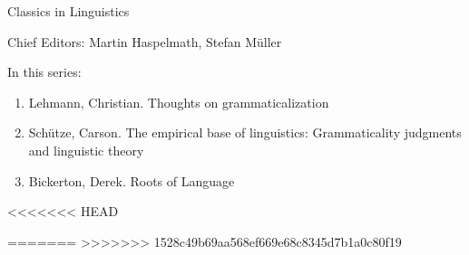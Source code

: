 {\large Classics in Linguistics}

\bigskip

Chief Editors: Martin Haspelmath, Stefan Müller

\bigskip

In this series:

\begin{enumerate}
\item Lehmann, Christian. Thoughts on grammaticalization
\item Schütze, Carson. The empirical base of linguistics: Grammaticality judgments and linguistic theory
\item Bickerton, Derek. Roots of Language
\end{enumerate}


\vfill

<<<<<<< HEAD


=======
>>>>>>> 1528c49b69aa568ef669e68c8345d7b1a0c80f19